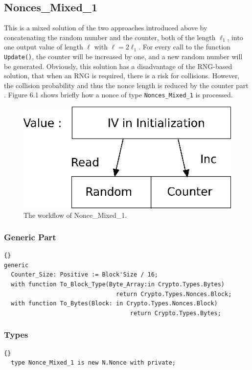 \subsection*{Nonces\_Mixed\_1}
This is a mixed solution of the two approaches introduced above by
concatenating the random number and the counter, both of the length
$\ell_1$, into one output value of length $\ell$ with
$\ell=2\ell_1$. For every call to the function \texttt{Update()}, the
counter will be increased by one, and a new random number will be
generated. Obviously, this solution has a disadvantage of the
RNG-based solution, that when an RNG is required, there is a risk for
collisions. However, the collision probability and thus the nonce
length is reduced by the counter part
\cite{DBLP:conf/isw/Zenner09}. Figure 6.1 shows briefly how a nonce of
type \texttt{Nonces\_Mixed\_1} is processed.
\begin{figure}[h]
\centering
\includegraphics[scale=0.8]{./images/Nonce_Mixed_1}
\caption{The workflow of Nonce\_Mixed\_1.}
\end{figure}
\subsubsection*{Generic Part}
\begin{lstlisting}{}
generic
  Counter_Size: Positive := Block'Size / 16;
  with function To_Block_Type(Byte_Array:in Crypto.Types.Bytes)
   								return Crypto.Types.Nonces.Block;
  with function To_Bytes(Block: in Crypto.Types.Nonces.Block)
    								return Crypto.Types.Bytes;
\end{lstlisting}


\subsubsection*{Types}
\begin{lstlisting}{}
  type Nonce_Mixed_1 is new N.Nonce with private;
\end{lstlisting}

